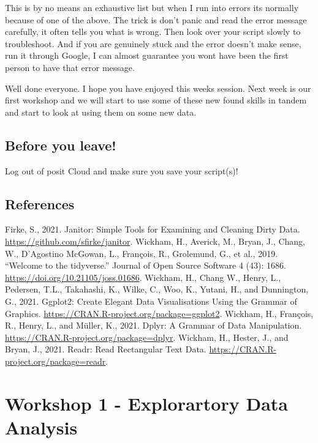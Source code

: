 \documentclass[
]{book}
\begin{document}
This is by no means an exhaustive list but when I run into errors its normally because of one of the above. The trick is don't panic and read the error message carefully, it often tells you what is wrong. Then look over your script slowly to troubleshoot. And if you are genuinely stuck and the error doesn't make sense, run it through Google, I can almost guarantee you wont have been the first person to have that error message.

Well done everyone. I hope you have enjoyed this weeks session. Next week is our first workshop and we will start to use some of these new found skills in tandem and start to look at using them on some new data.

\hypertarget{before-you-leave-1}{%
\section{Before you leave!}\label{before-you-leave-1}}

Log out of posit Cloud and make sure you save your script(s)!

\hypertarget{references}{%
\section{References}\label{references}}

Firke, S., 2021. Janitor: Simple Tools for Examining and Cleaning Dirty Data. \url{https://github.com/sfirke/janitor}.
Wickham, H., Averick, M., Bryan, J., Chang, W., D'Agostino McGowan, L., François, R., Grolemund, G., et al., 2019. ``Welcome to the tidyverse.'' Journal of Open Source Software 4 (43): 1686. \url{https://doi.org/10.21105/joss.01686}.
Wickham, H., Chang W., Henry, L., Pedersen, T.L., Takahashi, K., Wilke, C., Woo, K., Yutani, H., and Dunnington, G., 2021. Ggplot2: Create Elegant Data Visualisations Using the Grammar of Graphics. \url{https://CRAN.R-project.org/package=ggplot2}.
Wickham, H., François, R., Henry, L., and Müller, K., 2021. Dplyr: A Grammar of Data Manipulation. \url{https://CRAN.R-project.org/package=dplyr}.
Wickham, H., Hester, J., and Bryan, J., 2021. Readr: Read Rectangular Text Data. \url{https://CRAN.R-project.org/package=readr}.

\hypertarget{workshop-1---explorartory-data-analysis}{%
\chapter{Workshop 1 - Explorartory Data Analysis}\label{workshop-1---explorartory-data-analysis}}
\end{document}
